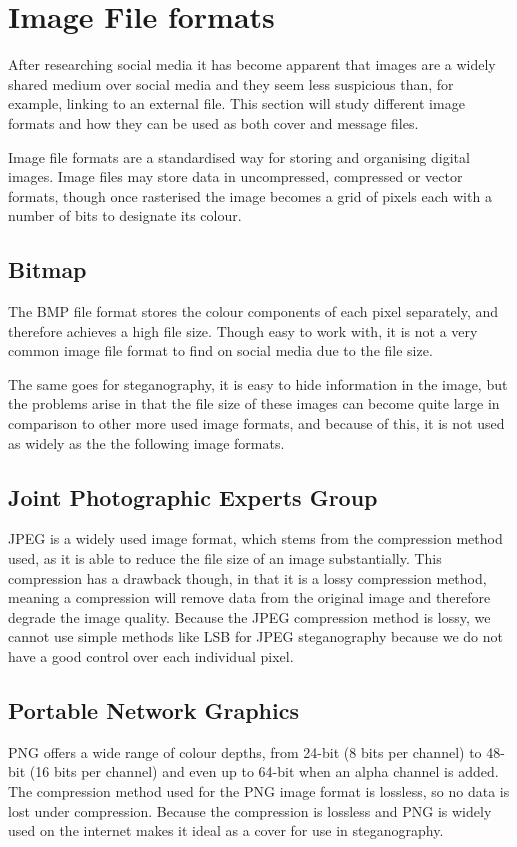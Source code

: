 \section{Image File formats}
After researching social media it has become apparent that images are a widely shared medium over social media and they seem less suspicious than, for example, linking to an external file. 
This section will study different image formats and how they can be used as both cover and message files.

Image file formats are a standardised way for storing and organising digital images.
Image files may store data in uncompressed, compressed or vector formats, though once rasterised the image becomes a grid of pixels each with a number of bits to designate its colour.

\subsection{Bitmap}
The BMP file format stores the colour components of each pixel separately, and therefore achieves a high file size. Though easy to work with, it is not a very common image file format to find on social media due to the file size.

The same goes for steganography, it is easy to hide information in the image, but the problems arise in that the file size of these images can become quite large in comparison to other more used image formats, and because of this, it is not used as widely as the the following image formats.

\subsection{Joint Photographic Experts Group}
JPEG is a widely used image format, which stems from the compression method used, as it is able to reduce the file size of an image substantially.
This compression has a drawback though, in that it is a lossy compression method, meaning a compression will remove data from the original image and therefore degrade the image quality.
Because the JPEG compression method is lossy, we cannot use simple methods like LSB for JPEG steganography because we do not have a good control over each individual pixel.

\subsection{Portable Network Graphics}
PNG offers a wide range of colour depths, from 24-bit (8 bits per channel) to 48-bit (16 bits per channel) and even up to 64-bit when an alpha channel is added.
The compression method used for the PNG image format is lossless, so no data is lost under compression.
Because the compression is lossless and PNG is widely used on the internet makes it ideal as a cover for use in steganography.

